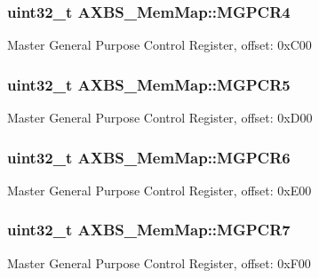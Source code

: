 \subsubsection[{M\+G\+P\+C\+R4}]{\setlength{\rightskip}{0pt plus 5cm}uint32\+\_\+t A\+X\+B\+S\+\_\+\+Mem\+Map\+::\+M\+G\+P\+C\+R4}\label{struct_a_x_b_s___mem_map_aa612f4c47ff1bbd854bacda326b25aea}
Master General Purpose Control Register, offset\+: 0x\+C00 \hypertarget{struct_a_x_b_s___mem_map_acb7e6f493df6513d2eca0df6a7f8f3ed}{}
\subsubsection[{M\+G\+P\+C\+R5}]{\setlength{\rightskip}{0pt plus 5cm}uint32\+\_\+t A\+X\+B\+S\+\_\+\+Mem\+Map\+::\+M\+G\+P\+C\+R5}\label{struct_a_x_b_s___mem_map_acb7e6f493df6513d2eca0df6a7f8f3ed}
Master General Purpose Control Register, offset\+: 0x\+D00 \hypertarget{struct_a_x_b_s___mem_map_a0d9951535d34de3707e889bc16f15cef}{}
\subsubsection[{M\+G\+P\+C\+R6}]{\setlength{\rightskip}{0pt plus 5cm}uint32\+\_\+t A\+X\+B\+S\+\_\+\+Mem\+Map\+::\+M\+G\+P\+C\+R6}\label{struct_a_x_b_s___mem_map_a0d9951535d34de3707e889bc16f15cef}
Master General Purpose Control Register, offset\+: 0x\+E00 \hypertarget{struct_a_x_b_s___mem_map_ae019ec14abd676615a5828fef3dde919}{}
\subsubsection[{M\+G\+P\+C\+R7}]{\setlength{\rightskip}{0pt plus 5cm}uint32\+\_\+t A\+X\+B\+S\+\_\+\+Mem\+Map\+::\+M\+G\+P\+C\+R7}\label{struct_a_x_b_s___mem_map_ae019ec14abd676615a5828fef3dde919}
Master General Purpose Control Register, offset\+: 0x\+F00 \hypertarget{struct_a_x_b_s___mem_map_a840c4c5791c39bad3cfa7140aaab0a1f}{}
